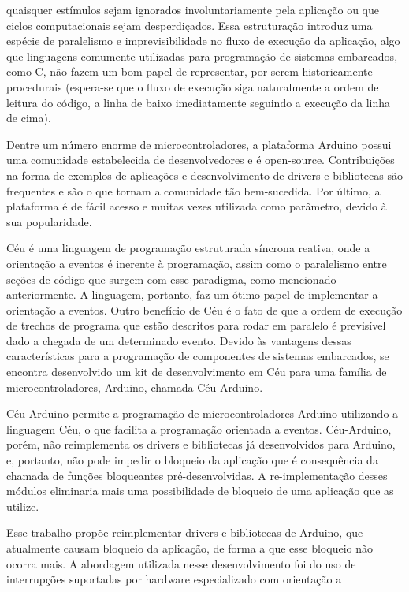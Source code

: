 \documentclass{article}
\begin{document}
quaisquer estímulos sejam ignorados involuntariamente pela aplicação ou que ciclos computacionais
sejam desperdiçados. Essa estruturação introduz uma espécie de paralelismo e imprevisibilidade no
fluxo de execução da aplicação, algo que linguagens comumente utilizadas para programação de
sistemas embarcados, como C, não fazem um bom papel de representar, por serem historicamente
procedurais (espera-se que o fluxo de execução siga naturalmente a ordem de leitura do código, a
linha de baixo imediatamente seguindo a execução da linha de cima).
\par Dentre um número enorme de microcontroladores, a plataforma Arduino possui uma comunidade estabelecida de desenvolvedores e é open-source. Contribuições na forma de
exemplos de aplicações e desenvolvimento de drivers e bibliotecas são frequentes e são o que tornam
a comunidade tão bem-sucedida. Por último, a plataforma é de fácil acesso e muitas vezes utilizada
como parâmetro, devido à sua popularidade. \cite{arduinoblog}
\par Céu é uma linguagem de programação estruturada síncrona reativa, onde a orientação a eventos é
inerente à programação, assim como o paralelismo entre seções de código que surgem com esse
paradigma, como mencionado anteriormente. A linguagem, portanto, faz um ótimo papel de
implementar a orientação a eventos. Outro benefício de Céu é o fato de que a ordem de execução de
trechos de programa que estão descritos para rodar em paralelo é previsível dado a chegada de um
determinado evento. \cite{santanna2012} Devido às vantagens dessas características para a programação de
componentes de sistemas embarcados, se encontra desenvolvido um kit de desenvolvimento em Céu para
uma família de microcontroladores, Arduino, chamada Céu-Arduino.
\par Céu-Arduino permite a programação de microcontroladores Arduino utilizando a linguagem Céu, o
que facilita a programação orientada a eventos. Céu-Arduino, porém, não reimplementa os drivers e
bibliotecas já desenvolvidos para Arduino, e, portanto, não pode impedir o
bloqueio da aplicação que é consequência da chamada de funções bloqueantes pré-desenvolvidas. A
re-implementação desses módulos eliminaria mais uma possibilidade de bloqueio de uma aplicação
que as utilize. \cite{githubceuarduino}
\par Esse trabalho propõe reimplementar drivers e bibliotecas de Arduino, que atualmente causam
bloqueio da aplicação, de forma a que esse bloqueio não ocorra mais. A abordagem utilizada nesse
desenvolvimento foi do uso de interrupções suportadas por hardware especializado com orientação a
\end{document}
